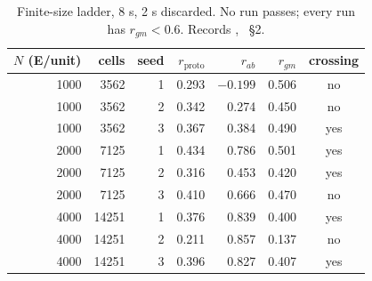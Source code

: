 \begin{table}[tbp]
\centering
\small
\begin{tabular}{rrrrrrc}
\toprule
$N$ (E/unit) & cells & seed & $r_\text{proto}$ & $r_{ab}$ & $r_{gm}$ & crossing \\
\midrule
1000 & 3562 & 1 & 0.293 & $-0.199$ & 0.506 & no \\
1000 & 3562 & 2 & 0.342 & 0.274 & 0.450 & no \\
1000 & 3562 & 3 & 0.367 & 0.384 & 0.490 & yes \\
2000 & 7125 & 1 & 0.434 & 0.786 & 0.501 & yes \\
2000 & 7125 & 2 & 0.316 & 0.453 & 0.420 & yes \\
2000 & 7125 & 3 & 0.410 & 0.666 & 0.470 & no \\
4000 & 14251 & 1 & 0.376 & 0.839 & 0.400 & yes \\
4000 & 14251 & 2 & 0.211 & 0.857 & 0.137 & no \\
4000 & 14251 & 3 & 0.396 & 0.827 & 0.407 & yes \\
\bottomrule
\end{tabular}
\caption{Finite-size ladder, 8 s, 2 s discarded. No run passes; every run has $r_{gm} < 0.6$.
Records , ~\S2.}
\label{tab:ladder}
\end{table}


